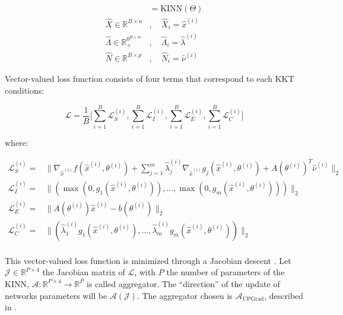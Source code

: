 \documentclass[
]{article}
\begin{document}
\begin{align}
[\hat{X}, \hat{\Lambda}, \hat{N}] &= \textrm{KINN}(\Theta)\\
\hat{X} \in \mathbb{R}^{B\times n}&, \quad \hat X_i = \hat{x}^{(i)}\\
\hat{\Lambda} \in \mathbb{R}^{0^{B\times m}}_+&, \quad \hat\Lambda_i = \hat\lambda^{(i)}\\
\hat{N} \in \mathbb{R}^{B\times p}&, \quad \hat{N}_i = \hat\nu^{(i)}
\end{align}

Vector-valued loss function consists of four terms that correspond to
each KKT conditions:

\begin{equation}
\mathcal{L} = \frac{1}{B}\biggr[\sum_{i=1}^B\mathcal{L}_{S}^{(i)}, \sum_{i=1}^B\mathcal{L}_{I}^{(i)}, \sum_{i=1}^B\mathcal{L}_{E}^{(i)}, \sum_{i=1}^B\mathcal{L}_{C}^{(i)}\biggr] 
\end{equation}

where:

\begin{align}
    \mathcal{L}_{S}^{(i)} =& \|\nabla_{\hat{x}^{(i)}} f(\hat{x}^{(i)}, \theta^{(i)}) + \sum\nolimits_{j=1}^m \hat{\lambda}^{(i)}_j\nabla_{\hat{x}^{(i)}} g_j(\hat{x}^{(i)}, \theta^{(i)}) + A(\theta^{(i)})^T\hat{\nu}^{(i)}\|_2\\ 
    \mathcal{L}_{I}^{(i)}  =& \|(\max(0, g_1(\hat{x}^{(i)}, \theta^{(i)})),\dots,\max(0, g_m(\hat{x}^{(i)}, \theta^{(i)})))\|_2\\
    \mathcal{L}_{E}^{(i)} =& \|A(\theta^{(i)}) \hat{x}^{(i)} - b(\theta^{(i)})\|_2\\
    \mathcal{L}_{C}^{(i)}  =& \|(\hat{\lambda}_1^{(i)} g_1(\hat{x}^{(i)}, \theta^{(i)}),\dots,\hat{\lambda}_m^{(i)} g_m(\hat{x}^{(i)}, \theta^{(i)}))\|_2\\
\end{align}

This vector-valued loss function is minimized through a Jacobian descent
\citep{quintonJacobianDescentMultiObjective2024a}. Let
\(\mathcal{J} \in \mathbb{R}^{P\times4}\) the Jacobian matrix of
\(\mathcal{L}\), with \(P\) the number of parameters of the KINN,
\(\mathcal{A}: \mathbb{R}^{P\times4} \to \mathbb{R}^{P}\) is called
aggregator. The ``direction'' of the update of networks parameters will
be \(\mathcal{A}(\mathcal{J})\). The aggregator chosen is
\(\mathcal{A}_{\mathrm{UPGrad}}\), described in
\citep{quintonJacobianDescentMultiObjective2024a}.

\newpage{}
\end{document}

